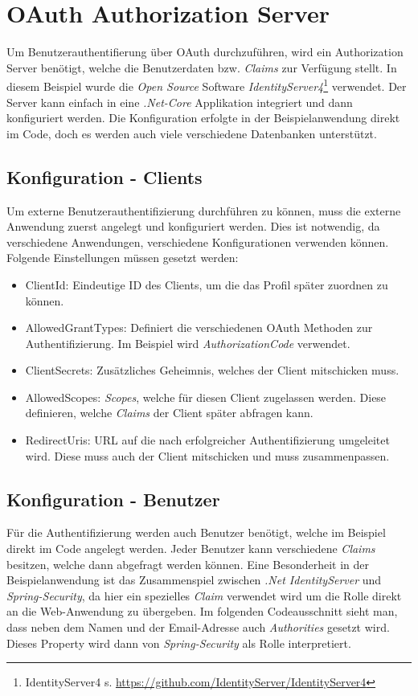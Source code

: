 \section{OAuth Authorization Server}
Um Benutzerauthentifierung über OAuth durchzuführen, wird ein Authorization Server benötigt, welche die Benutzerdaten bzw. \emph{Claims} zur Verfügung stellt. In diesem Beispiel wurde die \emph{Open Source} Software \emph{IdentityServer4}\footnote{IdentityServer4 s. \url{https://github.com/IdentityServer/IdentityServer4}} verwendet. 
\newline
\newline
Der Server kann einfach in eine \emph{.Net-Core} Applikation integriert und dann konfiguriert werden. Die Konfiguration erfolgte in der Beispielanwendung direkt im Code, doch es werden auch viele verschiedene Datenbanken unterstützt.
\subsection*{Konfiguration - Clients}
Um externe Benutzerauthentifizierung durchführen zu können, muss die externe Anwendung zuerst angelegt und konfiguriert werden. Dies ist notwendig, da verschiedene Anwendungen, verschiedene Konfigurationen verwenden können. Folgende Einstellungen müssen gesetzt werden:
\begin{itemize}
\item ClientId: Eindeutige ID des Clients, um die das Profil später zuordnen zu können.
\item AllowedGrantTypes: Definiert die verschiedenen OAuth Methoden zur Authentifizierung. Im Beispiel wird \emph{AuthorizationCode} verwendet.
\item ClientSecrets: Zusätzliches Geheimnis, welches der Client mitschicken muss.
\item AllowedScopes: \emph{Scopes}, welche für diesen Client zugelassen werden. Diese definieren, welche \emph{Claims} der Client später abfragen kann.
\item RedirectUris: URL auf die nach erfolgreicher Authentifizierung umgeleitet wird. Diese muss auch der Client mitschicken und muss zusammenpassen.
\end{itemize}

\subsection*{Konfiguration - Benutzer}
Für die Authentifizierung werden auch Benutzer benötigt, welche im Beispiel direkt im Code angelegt werden. Jeder Benutzer kann verschiedene \emph{Claims} besitzen, welche dann abgefragt werden können. Eine Besonderheit in der Beispielanwendung ist das Zusammenspiel zwischen \emph{.Net IdentityServer} und \emph{Spring-Security}, da hier ein spezielles \emph{Claim} verwendet wird um die Rolle direkt an die Web-Anwendung zu übergeben. Im folgenden Codeausschnitt sieht man, dass neben dem Namen und der Email-Adresse auch \emph{Authorities} gesetzt wird. Dieses Property wird dann von \emph{Spring-Security} als Rolle interpretiert.

